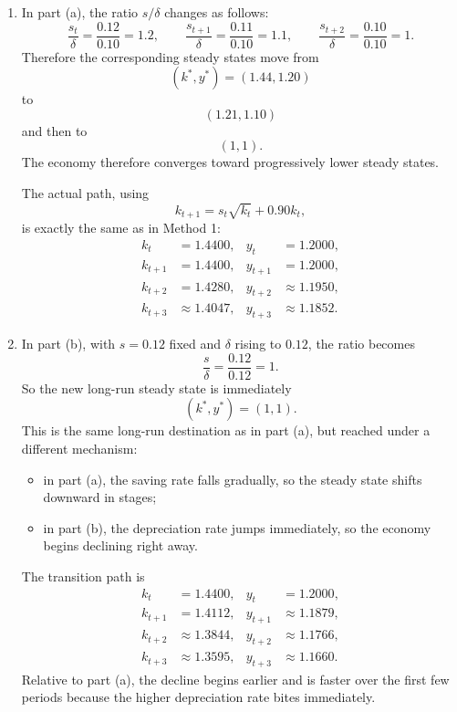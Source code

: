 \documentclass[12pt]{article}
\begin{document}
\begin{enumerate}[label=(\alph*)]
    \item
    In part (a), the ratio \(s/\delta\) changes as follows:
    \[
    \frac{s_t}{\delta}=\frac{0.12}{0.10}=1.2,
    \qquad
    \frac{s_{t+1}}{\delta}=\frac{0.11}{0.10}=1.1,
    \qquad
    \frac{s_{t+2}}{\delta}=\frac{0.10}{0.10}=1.
    \]
    Therefore the corresponding steady states move from
    \[
    (k^*,y^*)=(1.44,1.20)
    \]
    to
    \[
    (1.21,1.10)
    \]
    and then to
    \[
    (1,1).
    \]
    The economy therefore converges toward progressively lower steady states.

    The actual path, using
    \[
    k_{t+1}=s_t\sqrt{k_t}+0.90k_t,
    \]
    is exactly the same as in Method 1:
    \[
    \boxed{
    \begin{aligned}
    k_t&=1.4400, & y_t&=1.2000,\\
    k_{t+1}&=1.4400, & y_{t+1}&=1.2000,\\
    k_{t+2}&=1.4280, & y_{t+2}&\approx 1.1950,\\
    k_{t+3}&\approx 1.4047, & y_{t+3}&\approx 1.1852.
    \end{aligned}}
    \]

    \item
    In part (b), with \(s=0.12\) fixed and \(\delta\) rising to \(0.12\), the ratio becomes
    \[
    \frac{s}{\delta}=\frac{0.12}{0.12}=1.
    \]
    So the new long-run steady state is immediately
    \[
    \boxed{(k^*,y^*)=(1,1).}
    \]
    This is the same long-run destination as in part (a), but reached under a different mechanism:
    \begin{itemize}[leftmargin=*]
        \item in part (a), the saving rate falls gradually, so the steady state shifts downward in stages;
        \item in part (b), the depreciation rate jumps immediately, so the economy begins declining right away.
    \end{itemize}

    The transition path is
    \[
    \boxed{
    \begin{aligned}
    k_t&=1.4400, & y_t&=1.2000,\\
    k_{t+1}&=1.4112, & y_{t+1}&\approx 1.1879,\\
    k_{t+2}&\approx 1.3844, & y_{t+2}&\approx 1.1766,\\
    k_{t+3}&\approx 1.3595, & y_{t+3}&\approx 1.1660.
    \end{aligned}}
    \]
    Relative to part (a), the decline begins earlier and is faster over the first few periods because the higher depreciation rate bites immediately.
\end{enumerate}
\end{document}
